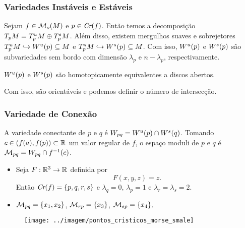 \documentclass{beamer}
\begin{document}
\begin{footnotesize}
\begin{frame}
	\end{frame}
	
	\begin{frame}
		\frametitle{Variedades Instáveis e Estáveis}
		\begin{teorema}
			Sejam $f \in \mathcal{M}_{o}(M)$ e $p \in \textit{Cr}(f)$. Então temos a decomposição $T_{p}M=T^{u}_{p}M\oplus T^{s}_{p}M$. Além disso, existem mergulhos suaves e sobrejetores $T^{u}_{p}M \hookrightarrow W^{u}(p) \subseteq M$ e $T^{s}_{p}M \hookrightarrow W^{s}(p) \subseteq M$. Com isso, $W^{u}(p)$ e $W^{s}(p)$ são subvariedades sem bordo com dimensão $\lambda_{p}$ e $n-\lambda_{p}$, respectivamente.
		\end{teorema}
	
		\begin{observacao}
			$W^{u}(p)$ e $W^{s}(p)$ são homotopicamente equivalentes a discos abertos.
		\end{observacao}
		
		\begin{tiny}
			Com isso, são orientáveis e podemos definir o número de intersecção.
		\end{tiny}
	\end{frame}
	
	\begin{frame}
		\frametitle{Variedade de Conexão}
		\begin{definicao}
			A variedade conectante de $p$ e $q$ é $W_{pq} = W^{u}(p)\cap W^{s}(q)$. Tomando $c \in (f(a), f(p)) \subset \mathbb{R}^{}$ um valor regular de $f$, o espaço moduli de $p$ e $q$ é $\mathcal{M}_{pq} = W_{pq}\cap f^{-1}(c)$.
		\end{definicao}
		
		\begin{minipage}[t]{0.55\linewidth}
			
			\begin{itemize}
				\item Seja $F:\mathbb{R}^{3} \to \mathbb{R}^{}$ definida por 
				$$
				F(x, y, z) = z.
				$$
				Então $\textit{Cr}(f) = \{p,q,r,s\}$ e $\lambda_{q} = 0$, $\lambda_{p} = 1$ e $\lambda_{r}=\lambda_{s} = 2$. 
				
				\item $\mathcal{M}_{pq}=\{x_{1}, x_{2}\}$, $\mathcal{M}_{rp} = \{ x_{3}\}$, $\mathcal{M}_{sp} = \{x_{4} \}$.
			\end{itemize}
		\end{minipage}
		\hfill%
		\begin{minipage}[t]{0.4\linewidth}
			\begin{figure}
				\centering
				\textbf{}\par
				\texttt{[image: ../imagem/pontos\_cristicos\_morse\_smale]}
			\end{figure}
			

\end{minipage}
\end{frame}
\end{footnotesize}
\end{document}
